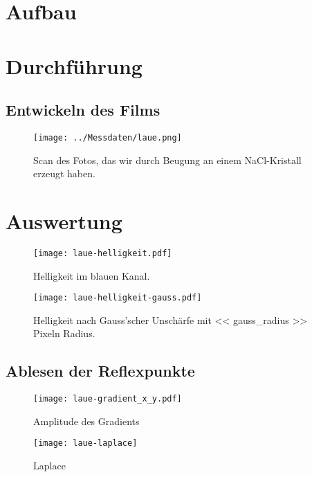 \section{Aufbau}

\section{Durchführung}

\subsection{Entwickeln des Films}

\begin{figure}[htbp]
    \centering
    \texttt{[image: ../Messdaten/laue.png]}
    \caption{%
        Scan des Fotos, das wir durch Beugung an einem NaCl-Kristall erzeugt
        haben.
    }
    \label{fig:Laue}
\end{figure}

\section{Auswertung}

\begin{figure}[htbp]
    \centering
    \texttt{[image: laue-helligkeit.pdf]}
    \caption{%
        Helligkeit im blauen Kanal.
    }
    \label{fig:}
\end{figure}

\begin{figure}[htbp]
    \centering
    \texttt{[image: laue-helligkeit-gauss.pdf]}
    \caption{%
        Helligkeit nach Gauss'scher Unschärfe mit << gauss_radius >> Pixeln
        Radius.
    }
    \label{fig:}
\end{figure}

\subsection{Ablesen der Reflexpunkte}

\begin{figure}[htbp]
    \centering
    \texttt{[image: laue-gradient\_x\_y.pdf]}
    \caption{%
        Amplitude des Gradients
    }
    \label{fig:}
\end{figure}

\begin{figure}[htbp]
    \centering
    \texttt{[image: laue-laplace]}
    \caption{%
        Laplace
    }
    \label{fig:}
\end{figure}

